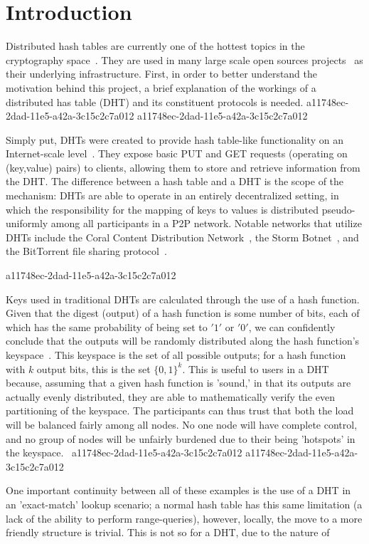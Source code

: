 \documentclass[12pt]{article}
\begin{document}
\section{Introduction}
\par Distributed hash tables are currently one of the hottest topics in the cryptography space~\cite{Stoica:2001dj,Rowstron:2001ea,Ratnasamy:2001wn}. They are used in many large scale open sources projects~\cite{Freitas:2013tb,Xu:2010vs,Perfitt:2010fh} as their underlying infrastructure. First, in order to better understand the motivation behind this project, a brief explanation of the workings of a distributed has table (DHT) and its constituent protocols is needed.
a11748ec-2dad-11e5-a42a-3c15c2c7a012
a11748ec-2dad-11e5-a42a-3c15c2c7a012\par Simply put, DHTs were created to provide hash table-like functionality on an Internet-scale level~\cite{Ratnasamy:2001wn}. They expose basic PUT and GET requests (operating on (key,value) pairs) to clients, allowing them to store and retrieve information from the DHT. The difference between a hash table and a DHT is the scope of the mechanism: DHTs are able to operate in an entirely decentralized setting, in which the responsibility for the mapping of keys to values is distributed pseudo-uniformly among all participants in a P2P network. Notable networks that utilize DHTs include the Coral Content Distribution Network~\cite{Freedman:2004vb}, the Storm Botnet~\cite{Holz:2008uk}, and the BitTorrent file sharing protocol~\cite{Cohen:y1_8mBnw}.

a11748ec-2dad-11e5-a42a-3c15c2c7a012\par Keys used in traditional DHTs are calculated through the use of a hash function. Given that the digest (output) of a hash function is some number of bits, each of which has the same probability of being set to $'1'$ or $'0'$, we can confidently conclude that the outputs will be randomly distributed along the hash function's keyspace~. This keyspace is the set of all possible outputs; for a hash function with $k$ output bits, this is the set $\{0,1\}^k$. This is useful to users in a DHT because, assuming that a given hash function is 'sound,' in that its outputs are actually evenly distributed, they are able to mathematically verify the even partitioning of the keyspace. The participants can thus trust that both the load will be balanced fairly among all nodes. No one node will have complete control, and no group of nodes will be unfairly burdened due to their being 'hotspots' in the keyspace.~
a11748ec-2dad-11e5-a42a-3c15c2c7a012
a11748ec-2dad-11e5-a42a-3c15c2c7a012\par One important continuity between all of these examples is the use of a DHT in an 'exact-match' lookup scenario; a normal hash table has this same limitation (a lack of the ability to perform range-queries), however, locally, the move to a more friendly structure is trivial. This is not so for a DHT, due to the nature of
\printbibliography
\end{document}
